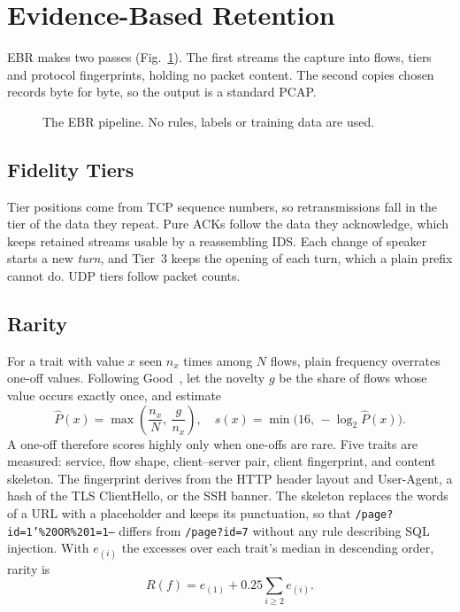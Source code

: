 \documentclass[conference]{IEEEtran}
\begin{document}
\section{Evidence-Based Retention}
EBR makes two passes (Fig.~\ref{fig:pipeline}). The first streams the capture into flows, tiers and protocol fingerprints, holding no packet content. The second copies chosen records byte for byte, so the output is a standard PCAP.

\begin{figure}[t]
\centering
{}
\caption{The EBR pipeline. No rules, labels or training data are used.}
\label{fig:pipeline}
\end{figure}

\subsection{Fidelity Tiers}
Tier positions come from TCP sequence numbers, so retransmissions fall in the tier of the data they repeat. Pure ACKs follow the data they acknowledge, which keeps retained streams usable by a reassembling IDS. Each change of speaker starts a new \emph{turn}, and Tier~3 keeps the opening of each turn, which a plain prefix cannot do. UDP tiers follow packet counts.

\subsection{Rarity}
For a trait with value $x$ seen $n_x$ times among $N$ flows, plain frequency overrates one-off values. Following Good~\cite{good}, let the novelty $g$ be the share of flows whose value occurs exactly once, and estimate
\begin{equation}
\hat{P}(x)=\max\!\left(\frac{n_x}{N},\ \frac{g}{n_x}\right),\quad s(x)=\min\bigl(16,\,-\log_2\hat{P}(x)\bigr).
\label{eq:gt}
\end{equation}
A one-off therefore scores highly only when one-offs are rare. Five traits are measured: service, flow shape, client--server pair, client fingerprint, and content skeleton. The fingerprint derives from the HTTP header layout and User-Agent, a hash of the TLS ClientHello, or the SSH banner. The skeleton replaces the words of a URL with a placeholder and keeps its punctuation, so that \texttt{/page?id=1'\%20OR\%201=1--} differs from \texttt{/page?id=7} without any rule describing SQL injection. With $e_{(i)}$ the excesses over each trait's median in descending order, rarity is
\begin{equation}
R(f)=e_{(1)}+0.25\sum_{i\ge 2} e_{(i)}.
\end{equation}
\end{document}
